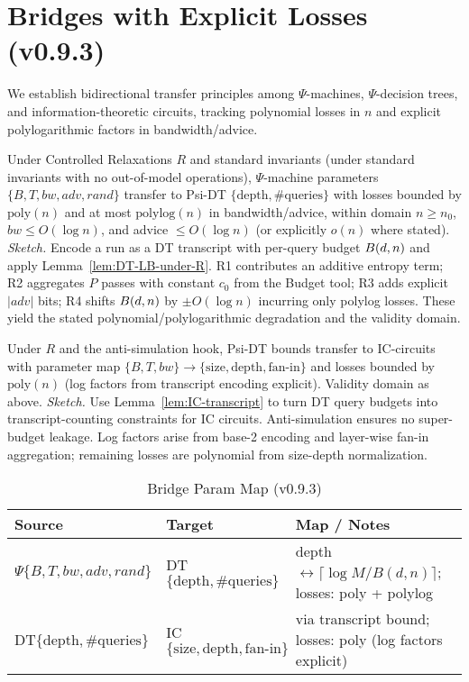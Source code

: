 \section{Bridges with Explicit Losses (v0.9.3)}

We establish bidirectional transfer principles among $\Psi$-machines, $\Psi$-decision trees, and information-theoretic circuits, tracking polynomial losses in $n$ and explicit polylogarithmic factors in bandwidth/advice.

\begin{theorem}\label{thm:bridge-machine-tree}
Under Controlled Relaxations $R$ and standard invariants (under standard invariants with no out-of-model operations), $\Psi$-machine parameters $\{B,T,bw,adv,rand\}$ transfer to Psi-DT $\{\mathrm{depth},\#\mathrm{queries}\}$ with losses bounded by $\mathrm{poly}(n)$ and at most $\mathrm{polylog}(n)$ in bandwidth/advice, within domain $n\ge n_0$, $bw\le O(\log n)$, and advice $\le O(\log n)$ (or explicitly $o(n)$ where stated).
\emph{Sketch.} Encode a run as a DT transcript with per-query budget $\B(d,n)$ and apply Lemma~\ref{lem:DT-LB-under-R}. R1 contributes an additive entropy term; R2 aggregates $P$ passes with constant $c_0$ from the Budget tool; R3 adds explicit $|adv|$ bits; R4 shifts $\B(d,n)$ by $\pm O(\log n)$ incurring only polylog losses. These yield the stated polynomial/polylogarithmic degradation and the validity domain.
\end{theorem}

\begin{theorem}\label{thm:bridge-tree-circuit}
Under $R$ and the anti-simulation hook, Psi-DT bounds transfer to IC-circuits with parameter map $\{B,T,bw\}\to\{\text{size},\text{depth},\text{fan-in}\}$ and losses bounded by $\mathrm{poly}(n)$ (log factors from transcript encoding explicit). Validity domain as above.
\emph{Sketch.} Use Lemma~\ref{lem:IC-transcript} to turn DT query budgets into transcript-counting constraints for IC circuits. Anti-simulation ensures no super-budget leakage. Log factors arise from base-2 encoding and layer-wise fan-in aggregation; remaining losses are polynomial from size-depth normalization.
\end{theorem}

\begin{table}[t]
\centering
\caption{Bridge Param Map (v0.9.3)}
\begin{tabular}{lll}
\toprule
Source & Target & Map / Notes \\
\midrule
$\Psi\{B,T,bw,adv,rand\}$ & DT$\{\mathrm{depth},\#\mathrm{queries}\}$ & depth $\leftrightarrow \lceil \log M / B(d,n)\rceil$; losses: poly + polylog \\
DT$\{\mathrm{depth},\#\mathrm{queries}\}$ & IC$\{\text{size},\text{depth},\text{fan-in}\}$ & via transcript bound; losses: poly (log factors explicit) \\
\bottomrule
\end{tabular}
\end{table}